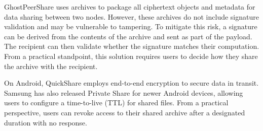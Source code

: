 GhostPeerShare uses archives to package all ciphertext objects and metadata for data sharing between two nodes. However, these archives do not include signature validation and may be vulnerable to tampering. To mitigate this risk, a signature can be derived from the contents of the archive and sent as part of the payload. The recipient can then validate whether the signature matches their computation. From a practical standpoint, this solution requires users to decide how they share the archive with the recipient.

On Android, QuickShare \cite{samsung_quick_2020} employs end-to-end encryption to secure data in transit. Samsung has also released Private Share for newer Android devices, allowing users to configure a time-to-live (TTL) for shared files. From a practical perspective, users can revoke access to their shared archive after a designated duration with no response.
